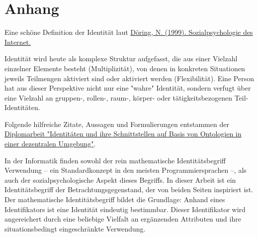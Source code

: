 
\section{Anhang}
\label{sec:anhang}

\vspace{0.3cm}

Eine schöne Definition der Identität laut \href{https://link.springer.com/article/10.1007/s11612-001-0022-y}{Döring, N. (1999). Sozialpsychologie des Internet.}

\vspace{0.3cm}

\begin{Business-Def}

Identität wird heute als komplexe Struktur aufgefasst, die aus einer Vielzahl einzelner Elemente besteht (Multiplizität), von denen in konkreten Situationen jeweils Teilmengen aktiviert sind oder aktiviert werden (Flexibilität). Eine Person hat aus dieser Perspektive nicht nur eine "wahre" Identität, sondern verfugt über eine Vielzahl an gruppen-, rollen-, raum-, körper- oder tätigkeitsbezogenen Teil-Identitäten.

\end{Business-Def}

\vspace{0.3cm}

Folgende hilfreiche Zitate, Aussagen und Formulierungen entstammen der \href{https://vsis-www.informatik.uni-hamburg.de/getDoc.php/thesis/47/DA_Gordian_Kaulbarsch.pdf}{Diplomarbeit "Identitäten und ihre Schnittstellen auf Basis von Ontologien in einer dezentralen Umgebung"}. 

\vspace{0.3cm}

\begin{Zitat}

In der Informatik finden sowohl der rein mathematische Identitätsbegriff Verwendung
– ein Standardkonzept in den meisten Programmiersprachen –, als auch der sozialpsychologische Aspekt dieses Begriffs. In dieser Arbeit ist ein Identitätsbegriff der Betrachtungsgegenstand, der von beiden Seiten inspiriert ist. Der mathematische Identitätsbegriff bildet die Grundlage: Anhand eines Identifikators ist eine Identität eindeutig
bestimmbar. Dieser Identifikator wird angereichert durch eine beliebige Vielfalt an ergänzenden Attributen und ihre situationsbedingt eingeschränkte Verwendung.

\end{Zitat}


